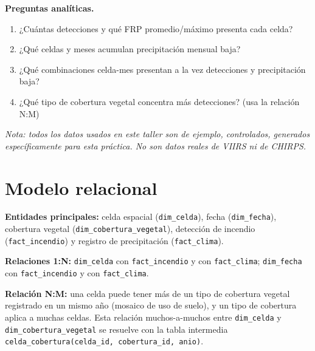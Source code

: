 \documentclass[11pt,a4paper]{article}
\begin{document}
\textbf{Preguntas anal\'iticas.}
\begin{enumerate}[itemsep=0pt]
    \item ¿Cu\'antas detecciones y qu\'e FRP promedio/m\'aximo presenta cada celda?
    \item ¿Qu\'e celdas y meses acumulan precipitaci\'on mensual baja?
    \item ¿Qu\'e combinaciones celda-mes presentan a la vez detecciones y precipitaci\'on baja?
    \item ¿Qu\'e tipo de cobertura vegetal concentra m\'as detecciones? (usa la relaci\'on N:M)
\end{enumerate}

\textit{Nota: todos los datos usados en este taller son de ejemplo, controlados, generados
espec\'ificamente para esta pr\'actica. No son datos reales de VIIRS ni de CHIRPS.}

\section{Modelo relacional}

\textbf{Entidades principales:} celda espacial (\texttt{dim\_celda}), fecha
(\texttt{dim\_fecha}), cobertura vegetal (\texttt{dim\_cobertura\_vegetal}), detecci\'on de
incendio (\texttt{fact\_incendio}) y registro de precipitaci\'on (\texttt{fact\_clima}).

\textbf{Relaciones 1:N:} \texttt{dim\_celda} con \texttt{fact\_incendio} y con
\texttt{fact\_clima}; \texttt{dim\_fecha} con \texttt{fact\_incendio} y con \texttt{fact\_clima}.

\textbf{Relaci\'on N:M:} una celda puede tener m\'as de un tipo de cobertura vegetal registrado
en un mismo a\~no (mosaico de uso de suelo), y un tipo de cobertura aplica a muchas celdas. Esta
relaci\'on muchos-a-muchos entre \texttt{dim\_celda} y \texttt{dim\_cobertura\_vegetal} se
resuelve con la tabla intermedia \texttt{celda\_cobertura(celda\_id, cobertura\_id, anio)}.
\end{document}
